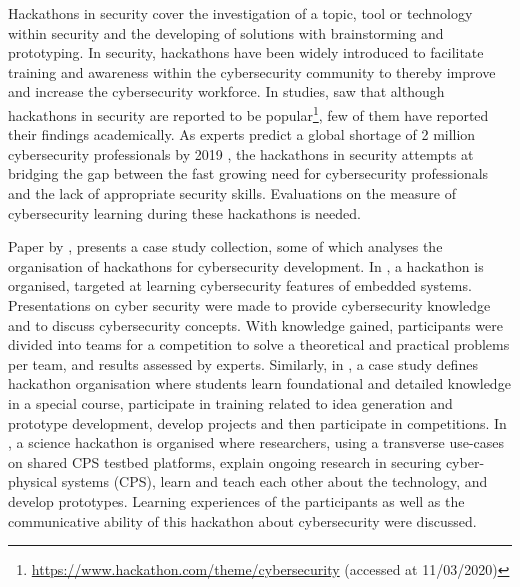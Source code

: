 \documentclass[runningheads]{llncs}
\begin{document}
Hackathons in security cover the investigation of a topic, tool or technology within security and the developing of solutions with brainstorming and prototyping.
In security, hackathons have been widely introduced to facilitate training and awareness within the cybersecurity community to thereby improve and increase the cybersecurity workforce. In studies, saw that although hackathons in security are reported to be popular\footnote{\url{https://www.hackathon.com/theme/cybersecurity} (accessed at 11/03/2020)}, few of them have reported their findings academically. %
As experts predict a global shortage of 2 million cybersecurity professionals by 2019 \cite{kauflin2017fast}, the hackathons in security attempts at bridging the gap between the fast growing need for cybersecurity professionals and the lack of appropriate security skills. Evaluations on the measure of cybersecurity learning during these hackathons is needed.

Paper  by \cite{kharchenko2016university}, presents a case study collection, some of which analyses the organisation of hackathons for cybersecurity development. In \cite{kharchenko2016university}, a hackathon is organised, targeted at learning cybersecurity features of embedded systems. Presentations on cyber security were made to provide cybersecurity knowledge and to discuss cybersecurity concepts. With knowledge gained, participants were divided into teams for a competition to solve a theoretical and practical problems per team, and results assessed by experts. Similarly, in \cite{starov2015hacking}, a case study defines hackathon organisation where students learn foundational and detailed knowledge in a special course, participate in training related to idea generation and prototype development, develop projects and then participate in competitions. In \cite{foley2018science}, a science hackathon is organised where researchers, using a transverse use-cases on shared CPS testbed platforms, explain ongoing research in securing cyber-physical systems (CPS), learn and teach each other about the technology, and develop prototypes. Learning experiences of the participants as well as the communicative ability of this hackathon about cybersecurity were discussed.
\end{document}
